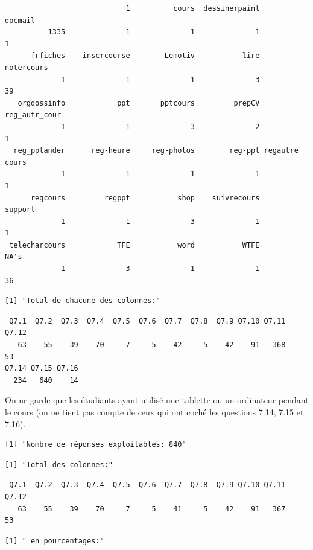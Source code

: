 \documentclass[]{article}
\begin{document}
\begin{verbatim}
                            1          cours  dessinerpaint        docmail 
          1335              1              1              1              1 
      frfiches    inscrcourse        Lemotiv           lire     notercours 
             1              1              1              3             39 
   orgdossinfo            ppt       pptcours         prepCV  reg_autr_cour 
             1              1              3              2              1 
  reg_pptander      reg-heure     reg-photos        reg-ppt regautre cours 
             1              1              1              1              1 
      regcours         regppt           shop    suivrecours        support 
             1              1              3              1              1 
 telecharcours            TFE           word           WTFE           NA's 
             1              3              1              1             36 
\end{verbatim}

\begin{verbatim}
[1] "Total de chacune des colonnes:"
\end{verbatim}

\begin{verbatim}
 Q7.1  Q7.2  Q7.3  Q7.4  Q7.5  Q7.6  Q7.7  Q7.8  Q7.9 Q7.10 Q7.11 Q7.12 
   63    55    39    70     7     5    42     5    42    91   368    53 
Q7.14 Q7.15 Q7.16 
  234   640    14 
\end{verbatim}

On ne garde que les étudiants ayant utilisé une tablette ou un
ordinateur pendant le cours (on ne tient pas compte de ceux qui ont
coché les questions 7.14, 7.15 et 7.16).

\begin{verbatim}
[1] "Nombre de réponses exploitables: 840"
\end{verbatim}

\begin{verbatim}
[1] "Total des colonnes:"
\end{verbatim}

\begin{verbatim}
 Q7.1  Q7.2  Q7.3  Q7.4  Q7.5  Q7.6  Q7.7  Q7.8  Q7.9 Q7.10 Q7.11 Q7.12 
   63    55    39    70     7     5    41     5    42    91   367    53 
\end{verbatim}

\begin{verbatim}
[1] " en pourcentages:"
\end{verbatim}
\end{document}

